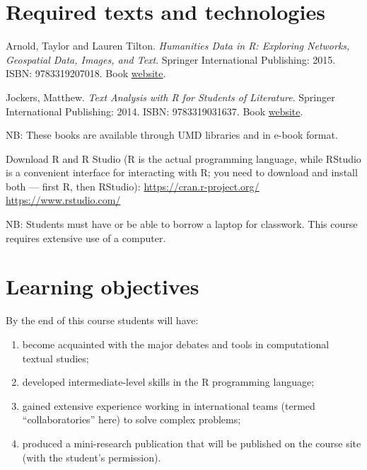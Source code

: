 \documentclass[
]{book}
\providecommand{\tightlist}{%
  \setlength{\itemsep}{0pt}\setlength{\parskip}{0pt}}
\begin{document}
\hypertarget{required-texts-and-technologies}{%
\section{Required texts and technologies}\label{required-texts-and-technologies}}

Arnold, Taylor and Lauren Tilton. \emph{Humanities Data in R: Exploring Networks, Geospatial Data, Images, and Text}. Springer International Publishing: 2015. ISBN: 9783319207018. Book \href{http://humanitiesdata.org/}{website}.

Jockers, Matthew. \emph{Text Analysis with R for Students of Literature}. Springer International Publishing: 2014. ISBN: 9783319031637. Book \href{http://www.matthewjockers.net/text-analysis-with-r-for-students-of-literature/}{website}.

NB: These books are available through UMD libraries and in e-book format.

Download R and R Studio (R is the actual programming language, while RStudio is a convenient interface for interacting with R; you need to download and install both --- first R, then RStudio):
\url{https://cran.r-project.org/}
\url{https://www.rstudio.com/}

NB: Students must have or be able to borrow a laptop for classwork. This course requires extensive use of a computer.

\hypertarget{learning-objectives}{%
\section{Learning objectives}\label{learning-objectives}}

By the end of this course students will have:

\begin{enumerate}
\def\labelenumi{(\arabic{enumi})}
\tightlist
\item
  become acquainted with the major debates and tools in computational textual studies;
\item
  developed intermediate-level skills in the R programming language;
\item
  gained extensive experience working in international teams (termed ``collaboratories'' here) to solve complex problems;
\item
  produced a mini-research publication that will be published on the course site (with the student's permission).
\end{enumerate}
\end{document}
